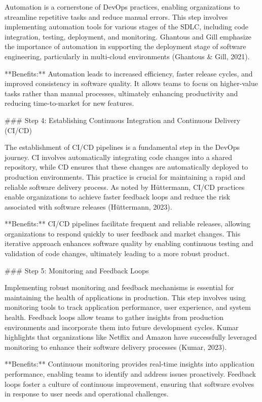 Automation is a cornerstone of DevOps practices, enabling organizations to streamline repetitive tasks and reduce manual errors. This step involves implementing automation tools for various stages of the SDLC, including code integration, testing, deployment, and monitoring. Ghantous and Gill emphasize the importance of automation in supporting the deployment stage of software engineering, particularly in multi-cloud environments (Ghantous & Gill, 2021).

**Benefits:** Automation leads to increased efficiency, faster release cycles, and improved consistency in software quality. It allows teams to focus on higher-value tasks rather than manual processes, ultimately enhancing productivity and reducing time-to-market for new features.

### Step 4: Establishing Continuous Integration and Continuous Delivery (CI/CD)

The establishment of CI/CD pipelines is a fundamental step in the DevOps journey. CI involves automatically integrating code changes into a shared repository, while CD ensures that these changes are automatically deployed to production environments. This practice is crucial for maintaining a rapid and reliable software delivery process. As noted by Hüttermann, CI/CD practices enable organizations to achieve faster feedback loops and reduce the risk associated with software releases (Hüttermann, 2023).

**Benefits:** CI/CD pipelines facilitate frequent and reliable releases, allowing organizations to respond quickly to user feedback and market changes. This iterative approach enhances software quality by enabling continuous testing and validation of code changes, ultimately leading to a more robust product.

### Step 5: Monitoring and Feedback Loops

Implementing robust monitoring and feedback mechanisms is essential for maintaining the health of applications in production. This step involves using monitoring tools to track application performance, user experience, and system health. Feedback loops allow teams to gather insights from production environments and incorporate them into future development cycles. Kumar highlights that organizations like Netflix and Amazon have successfully leveraged monitoring to enhance their software delivery processes (Kumar, 2023).

**Benefits:** Continuous monitoring provides real-time insights into application performance, enabling teams to identify and address issues proactively. Feedback loops foster a culture of continuous improvement, ensuring that software evolves in response to user needs and operational challenges.

